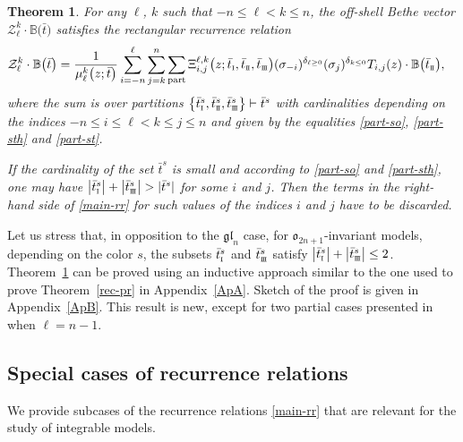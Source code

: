 \documentclass[pdftex]{sigma}
\newcommand{\so}{\scriptscriptstyle \rm I}
\newcommand{\st}{\scriptscriptstyle \rm I\hspace{-1pt}I}
\newcommand{\sth}{\scriptscriptstyle \rm I\hspace{-1pt}I\hspace{-1pt}I}
\newcommand{\bt}{{\bar t}}
\newtheorem{thm}{Theorem}[section]
\theoremstyle{definition}
\def\BB{{\mathbb{B}}}
\def\r#1{\eqref{#1}}
\def\Z{\mathcal{Z}}
\begin{document}
\begin{thm}\label{main-th}
For any $\ell$, $k$ such that $-n\leq \ell <k\leq n$, the off-shell Bethe vector
$\Z^k_\ell\cdot\BB\bigl(\bt\bigr)$ satisfies the rectangular recurrence relation
\begin{align}
\Z^k_\ell\cdot\BB\bigl(\bt\bigr)={}&\frac{1}{\mu^k_\ell\bigl(z;\bt\bigr)}\sum_{i=-n}^\ell
\sum_{j=k}^n\sum_{\rm part}
\Xi^{\ell,k}_{i,j}\bigl(z;\bt_{\so},\bt_{\st},\bt_{\sth}\bigr) (\sigma_{-i})^{\delta_{\ell\geq0}}
(\sigma_{j})^{\delta_{k\leq 0}} T_{i,j}(z)\cdot\BB\bigl(\bt_{\st}\bigr) ,\label{main-rr}
\end{align}
where the sum is over partitions
$\bigl\{\bt^s_{\so},\bt^s_{\st},\bt^s_{\sth}\bigr\}\vdash \bt^s$ with
cardinalities depending on the indices $-n\leq i\leq \ell<k\leq j\leq n$ and given by the equalities \r{part-so}, \r{part-sth} and \r{part-st}.

If the cardinality of the set $\bt^s$ is small and
according to \r{part-so} and \r{part-sth}, one may have $\big|\bt^s_{\so}\big|+\big|\bt^s_{\sth}\big|>|\bt^s|$
for some $i$ and $j$. Then the terms in
the right-hand side of \r{main-rr} for such values of the indices $i$ and $j$ have to be discarded.
\end{thm}

Let us stress that, in opposition to the $\mathfrak{gl}_n$ case, for
$\mathfrak{o}_{2n+1}$-invariant models, depending on the color $s$,
the subsets $\bt^s_{\so}$ and $\bt^s_{\sth}$ satisfy $\big|\bt^s_{\so}\big|+\big|\bt^s_{\sth}\big| \le 2$.
Theorem~\ref{main-th} can be proved using an inductive
approach similar to the one used to prove Theorem~\ref{rec-pr} in Appendix~\ref{ApA}. Sketch of the proof is given in Appendix~\ref{ApB}.
This result is new, except for two partial cases presented in~\cite{LP2} when $\ell=n-1$.

\subsection{Special cases of recurrence relations}\label{sect:ex-rec}
We provide subcases of the recurrence relations
\r{main-rr} that are relevant for the study of integrable models.
\end{document}

